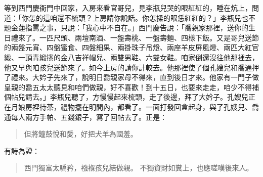 等到西門慶衙門中回家，入房來看官哥兒，見李瓶兒哭的眼紅紅的，睡在炕上，問道：「你怎的這咱還不梳頭？上房請你說話。你怎揉的眼恁紅紅的？」李瓶兒也不題金蓮指罵之事，只說：「我心中不自在。」西門慶告說：「喬親家那裡，送你的生日禮來了。一匹尺頭、兩壇南酒、一盤壽桃、一盤壽麵、四樣下飯。又是哥兒送節的兩盤元宵、四盤蜜食、四盤細果、兩掛珠子吊燈、兩座羊皮屏風燈、兩匹大紅官緞、一頂青緞㩟的金八吉祥帽兒、兩雙男鞋、六雙女鞋。咱家倒還沒往他那裡去，他又早與咱孩兒送節來了。如今上房的請你計較去。他那裡使了個孔嫂兒和喬通押了禮來。大妗子先來了，說明日喬親家母不得來，直到後日才來。他家有一門子做皇親的喬五太太聽見和咱們做親，好不喜歡！到十五日，也要來走走，咱少不得補個帖兒請去。」李瓶兒聽了，方慢慢起來梳頭，走了後邊，拜了大妗子。孔嫂兒正在月娘房裡待茶，禮物擺在明間內，都看了。一面打發回盒起身，與了孔嫂兒、喬通每人兩方手帕、五錢銀子，寫了回帖去了。正是：
\begin{quote}
但將鐘鼓悅和愛，好把犬羊為國羞。
\end{quote}
有詩為證：
\begin{quote}
西門獨富太驕矜，襁褓孩兒結做親。
不獨資財如糞上，也應嗟嘆後來人。
\end{quote}
